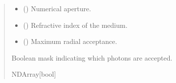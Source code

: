\documentclass[letterpaper,10pt,english]{sphinxmanual}
\begin{document}
\begin{fulllineitems}
\begin{quote}
\begin{description}
\begin{itemize}
\item {} 
\sphinxAtStartPar
{} () \textendash{} Numerical aperture.

\item {} 
\sphinxAtStartPar
{} () \textendash{} Refractive index of the medium.

\item {} 
\sphinxAtStartPar
{} () \textendash{} Maximum radial acceptance.

\end{itemize}

\sphinxAtStartPar
Boolean mask indicating which photons are accepted.

\sphinxAtStartPar
NDArray{[}bool{]}

\end{description}\end{quote}

\end{fulllineitems}

\end{document}
